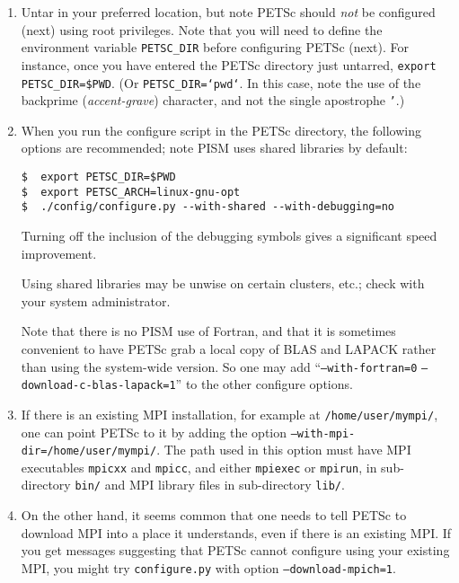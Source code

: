 \documentclass[11pt,final]{amsart}
\newcommand{\und}{\_\!\_}
\begin{document}
\begin{enumerate}
\renewcommand{\labelenumii}{(\roman{enumii})}\begin{enumerate}
\item Untar in your preferred location, but note PETSc should \emph{not} be configured (next) using root privileges.  Note that you will need to define the environment variable \texttt{PETSC_DIR}\index{PETSC\und DIR} before configuring PETSc (next).  For instance, once you have entered the PETSc directory just untarred, \texttt{export PETSC_DIR=\$PWD}. (Or \texttt{PETSC_DIR=`pwd`}.  In this case, note the use of the backprime (\emph{accent-grave}) character, and not the single apostrophe \texttt{'}.)

\item When you run the configure script in the PETSc directory, the following options are recommended; note PISM uses shared libraries by default:\index{PETSC\und ARCH}
\begin{verbatim}
$  export PETSC_DIR=$PWD
$  export PETSC_ARCH=linux-gnu-opt
$  ./config/configure.py --with-shared --with-debugging=no
\end{verbatim}

Turning off the inclusion of the debugging symbols gives a significant speed improvement.

Using shared libraries may be unwise on certain clusters, etc.; check with your system administrator.

Note that there is no PISM use of Fortran, and that it is sometimes convenient to have PETSc grab a local copy of BLAS and LAPACK rather than using the system-wide version.  So one may add ``\texttt{--with-fortran=0} \texttt{--download-c-blas-lapack=1}'' to the other configure options.

\item If there is an existing MPI installation, for example at \texttt{/home/user/mympi/}, one can point PETSc to it by adding the option \texttt{--with-mpi-dir=/home/user/mympi/}.  The path used in this option must have MPI executables \texttt{mpicxx} and \texttt{mpicc}, and either \texttt{mpiexec} or \texttt{mpirun}, in sub-directory \texttt{bin/} and MPI library files in sub-directory \texttt{lib/}.

\item On the other hand, it seems common that one needs to tell PETSc to download MPI into a place it understands, even if there is an existing MPI.  If you get messages suggesting that PETSc cannot configure using your existing MPI, you might try \texttt{configure.py} with option \texttt{--download-mpich=1}.


\end{enumerate}
\end{enumerate}
\end{document}
